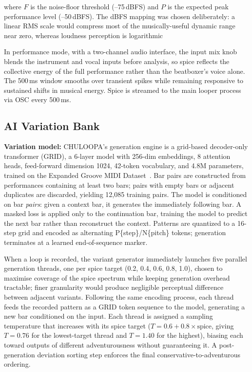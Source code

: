 \documentclass{aimc2026}
\begin{document}
where $F$ is the noise-floor threshold (--75\,dBFS) and $P$ is the expected peak performance level (--50\,dBFS). The dBFS mapping was chosen deliberately: a linear RMS scale would compress most of the musically-useful dynamic range near zero, whereas loudness perception is logarithmic

In performance mode, with a two-channel audio interface, the input mix knob blends the instrument and vocal inputs before analysis, so spice reflects the collective energy of the full performance rather than the beatboxer's voice alone. The 500\,ms window smooths over transient spikes while remaining responsive to sustained shifts in musical energy. Spice is streamed to the main looper process via OSC every 500\,ms.

\subsection{AI Variation Bank}

\textbf{Variation model:} CHULOOPA's generation engine is a grid-based decoder-only transformer (GRID), a 6-layer model with 256-dim embeddings, 8 attention heads, feed-forward dimension 1024, 42-token vocabulary, and 4.8M parameters, trained on the Expanded Groove MIDI Dataset~\citep{callender2020improving}. Bar pairs are constructed from performances containing at least two bars; pairs with empty bars or adjacent duplicates are discarded, yielding 12,085 training pairs. The model is conditioned on bar \emph{pairs}: given a context bar, it generates the immediately following bar. A masked loss is applied only to the continuation bar, training the model to predict the next bar rather than reconstruct the context. Patterns are quantized to a 16-step grid and encoded as alternating P\{step\}/N\{pitch\} tokens; generation terminates at a learned end-of-sequence marker.

When a loop is recorded, the variant generator immediately launches five parallel generation threads, one per spice target (0.2, 0.4, 0.6, 0.8, 1.0), chosen to maximise coverage of the spice spectrum while keeping generation overhead tractable; finer granularity would produce negligible perceptual difference between adjacent variants. Following the same encoding process, each thread feeds the recorded pattern as a GRID token sequence to the model, generating a new bar conditioned on the input. Each thread is assigned a sampling temperature that increases with its spice target ($T = 0.6 + 0.8 \times \text{spice}$, giving $T\!=\!0.76$ for the lowest-target thread and $T\!=\!1.40$ for the highest), biasing each toward outputs of different adventurousness without guaranteeing it. A post-generation deviation sorting step enforces the final conservative-to-adventurous ordering.
\end{document}
